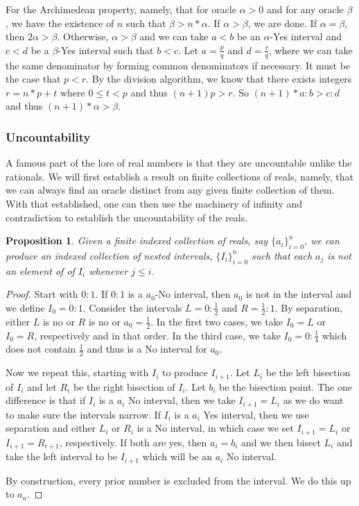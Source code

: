 \documentclass[12pt]{article}
\newtheorem{proposition}{Proposition}
\theoremstyle{remark}
\begin{document}
For the Archimedean property, namely, that for oracle $\alpha > 0$ and for any oracle $\beta$, we have the existence of $n$ such that $\beta > n * \alpha $. If $\alpha > \beta$, we are done. If $\alpha = \beta$, then $2 \alpha > \beta$. Otherwise, $\alpha > \beta$ and we can take $a<b$ be an $\alpha$-Yes interval and $c<d$ be a $\beta$-Yes interval such that $b < c$. Let $a = \frac{p}{q}$ and $d = \frac{r}{q}$, where we can take the same denominator by forming common denominators if necessary. It must be the case that $p < r$. By the division algorithm, we know that there exists integers $r = n*p + t$ where $0 \leq  t<p$ and thus $(n+1)p > r$. So $(n+1)*a:b > c:d$ and thus $(n+1)*\alpha > \beta$.

\subsubsection{Uncountability}

A famous part of the lore of real numbers is that they are uncountable unlike the rationals. We will first establish a result on finite collections of reals, namely, that we can always find an oracle distinct from any given finite collection of them. With that established, one can then use the machinery of infinity and contradiction to establish the uncountability of the reals. 

\begin{proposition}
Given a finite indexed collection of reals, say $\{a_i\}_{i=0}^n$, we can produce an indexed collection of nested intervals, $\{I_i\}_{i=0}^n$ such that each $a_j$ is not an element of of $I_i$ whenever $j \leq i$.
\end{proposition}

\begin{proof}
Start with $0:1$. If $0:1$ is a $a_0$-No interval, then $a_0$ is not in the interval and we define $I_0 = 0:1$.  Consider the intervals $L= 0:\tfrac{1}{2}$ and $R = \tfrac{1}{2}:1$. By separation, either $L$ is no or $R$ is no or $a_0 = \tfrac{1}{2}$. In the first two cases, we take $I_0=L$ or $I_0=R$, respectively and in that order. In the third case, we take $I_0 = 0:\tfrac{1}{4}$ which does not contain $\tfrac{1}{2}$ and thus is a No interval for $a_0$.

Now we repeat this, starting with $I_i$ to produce $I_{i+1}$. Let $L_i$ be the left bisection of $I_i$ and let $R_i$ be the right bisection of $I_i$. Let $b_i$ be the bisection point. The one difference is that if $I_i$ is a $a_i$ No interval, then we take $I_{i+1} = L_i$ as we do want to make sure the intervals narrow. If $I_i$ is a $a_i$ Yes interval, then we use separation and either $L_i$ or $R_i$ is a No interval, in which case we set $I_{i+1} = L_i $ or $I_{i+1} = R_{i+1}$, respectively. If both are yes, then $a_i = b_i$ and we then bisect $L_i$ and take the left interval to be $I_{i+1}$ which will be an $a_i$ No interval. 

By construction, every prior number is excluded from the interval. We do this up to $a_n$.
\end{proof} 
\end{document}
